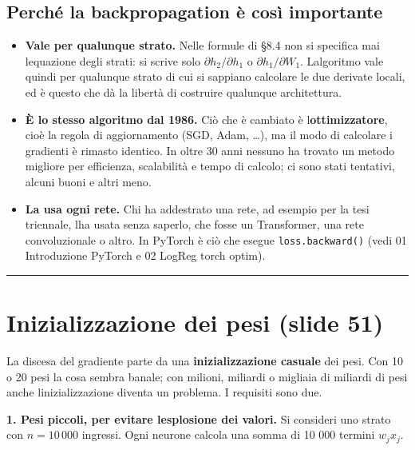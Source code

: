 \documentclass[11pt,a4paper,oneside,openany]{book}
\providecommand{\tightlist}{\setlength{\itemsep}{0pt}\setlength{\parskip}{0pt}}
\begin{document}
\subsection{Perché la backpropagation è così importante}\label{f01-r914}

\begin{itemize}
\tightlist
\item
  \textbf{Vale per qualunque strato.} Nelle formule di §8.4 non si specifica mai l\textquotesingle equazione degli strati: si scrive solo \(\partial h_2/\partial h_1\) o \(\partial h_1/\partial W_1\). L\textquotesingle algoritmo vale quindi per qualunque strato di cui si sappiano calcolare le due derivate locali, ed è questo che dà la libertà di costruire qualunque architettura.
\item
  \textbf{È lo stesso algoritmo dal 1986.} Ciò che è cambiato è l\textquotesingle{}\textbf{ottimizzatore}, cioè la regola di aggiornamento (SGD, Adam, \ldots), ma il modo di calcolare i gradienti è rimasto identico. In oltre 30 anni nessuno ha trovato un metodo migliore per efficienza, scalabilità e tempo di calcolo; ci sono stati tentativi, alcuni buoni e altri meno.
\item
  \textbf{La usa ogni rete.} Chi ha addestrato una rete, ad esempio per la tesi triennale, l\textquotesingle ha usata senza saperlo, che fosse un Transformer, una rete convoluzionale o altro. In PyTorch è ciò che esegue \texttt{loss.backward()} (vedi 01 Introduzione PyTorch e 02 LogReg torch optim).
\end{itemize}

\begin{center}\rule{0.5\linewidth}{0.5pt}\end{center}

\section{Inizializzazione dei pesi (slide 51)}\label{f01-r922}

La discesa del gradiente parte da una \textbf{inizializzazione casuale} dei pesi. Con 10 o 20 pesi la cosa sembra banale; con milioni, miliardi o migliaia di miliardi di pesi anche l\textquotesingle inizializzazione diventa un problema. I requisiti sono due.

\textbf{1. Pesi piccoli, per evitare l\textquotesingle esplosione dei valori.} Si consideri uno strato con \(n = 10\,000\) ingressi. Ogni neurone calcola una somma di 10 000 termini \(w_j x_j\).
\end{document}
